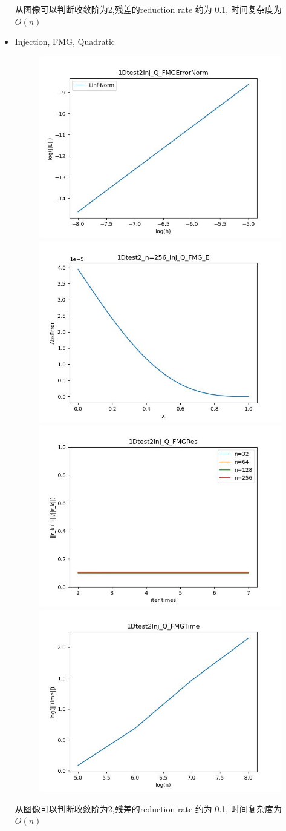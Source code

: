 \documentclass{article}
\begin{document}
\begin{itemize}
    从图像可以判断收敛阶为2,残差的reduction rate 约为 0.1, 时间复杂度为$O(n)$
    \newpage
    \item Injection, FMG, Quadratic
    \begin{figure}[h]
        \centering
        \includegraphics[width=0.35\linewidth]{1Dtest2Inj_Q_FMGErrorNorm.jpg}
        \includegraphics[width=0.35\linewidth]{1Dtest2_n=256_Inj_Q_FMG_E.jpg}
        \includegraphics[width=0.35\linewidth]{1Dtest2Inj_Q_FMGRes.jpg}
        \includegraphics[width=0.35\linewidth]{1Dtest2Inj_Q_FMGTime.jpg}
    \end{figure}
    
    从图像可以判断收敛阶为2,残差的reduction rate 约为 0.1, 时间复杂度为$O(n)$
    


\end{itemize}
\end{document}
